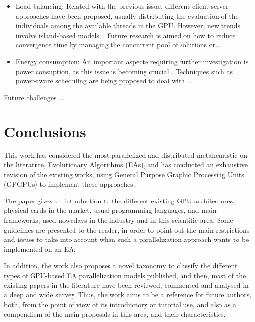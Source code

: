 \documentclass{article}
\begin{document}
\begin{itemize}
\item Load balancing: Related with the previous issue, different client-server approaches have been proposed, usually distributing the evaluation of the individuals among the available threads in the GPU. However, new trends involve island-based models... Future research is aimed on how to reduce convergence time by managing the concurrent pool of solutions \cite{Rey2018} or...

\item Energy consumption: An important aspecte requiring further investigation is power consuption, as this issue is becoming crucial \cite{Maggiani2018}. Techniques such as power-aware scheduling \cite{Escobar17GPUCPU} are being proposed to deal with ... 

\end{itemize}


Future challenges ...

\section{Conclusions}
\label{sec:conclusions}

This work has considered the most parallelized and distributed
metaheuristic on the literature, Evolutionary Algorithms (EAs), and
has conducted an exhaustive revision of the existing works, using
General Purpose Graphic Processing Units (GPGPUs) to implement these
approaches.

The paper gives an introduction to the different existing GPU architectures, physical cards in the market, usual programming languages, and main frameworks, used nowadays in the industry and in this scientific area.
Some guidelines are presented to the reader, in order to point out the main restrictions and issues to take into account when such a parallelization approach wants to be implemented on an EA.

In addition, the work also proposes a novel taxonomy to classify the different types of GPU-based EA parallelization models published, and then, most of the existing papers in the literature have been reviewed, commented and analysed in a deep and wide survey.
Thus, the work aims to be a reference for future authors, both, from the point of view of its introductory or tutorial use, and also as a compendium of the main proposals in this area, and their characteristics.
\end{document}
